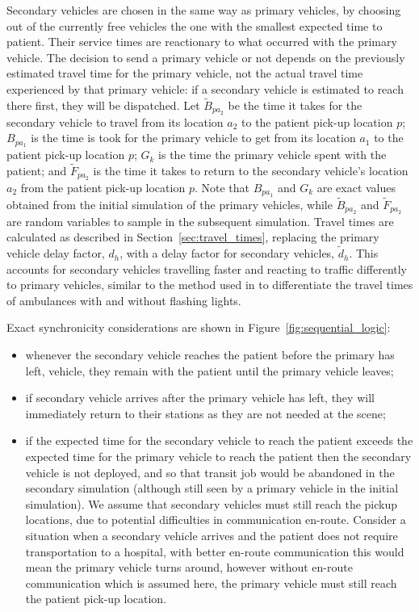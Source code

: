 \documentclass[numbers,webpdf,imaman]{ima-authoring-template}%
\begin{document}
Secondary vehicles are chosen in the same way as primary vehicles, by choosing
out of the currently free vehicles the one with the smallest expected time to
patient. Their service times are reactionary to what occurred with the primary
vehicle. The decision to send a primary vehicle or not depends on the previously
estimated travel time for the primary vehicle, not the actual travel time
experienced by that primary vehicle: if a secondary vehicle is estimated to
reach there first, they will be dispatched.
Let $\tilde{B}_{pa_2}$ be the time it takes for the secondary vehicle to travel
from its location $a_2$ to the patient pick-up location $p$; $B_{pa_1}$ is the
time is took for the primary vehicle to get from its location $a_1$ to the
patient pick-up location $p$; $G_k$ is the time the primary vehicle spent
with the patient; and $\tilde{F}_{pa_2}$ is the time it takes to return to the
secondary vehicle's location $a_2$ from the patient pick-up location $p$.
Note that $B_{pa_1}$ and $G_k$ are exact values obtained from the
initial simulation of the primary vehicles, while $\tilde{B}_{pa_2}$ and
$\tilde{F}_{pa_2}$ are random variables to sample in the subsequent simulation.
Travel times are calculated as described in Section~\ref{sec:travel_times},
replacing the primary vehicle delay factor, $d_h$, with a delay factor for
secondary vehicles, $\tilde{d}_h$. This accounts for secondary vehicles
travelling faster and reacting to traffic differently to primary vehicles,
similar to the method used in \citet{hendersonmason04} to differentiate the
travel times of ambulances with and without flashing lights.

Exact synchronicity considerations are shown in Figure~\ref{fig:sequential_logic}:
\begin{itemize}
  \item whenever the secondary vehicle reaches the patient before the primary
  has left, vehicle, they remain with the patient until the primary vehicle
  leaves;
  \item if secondary vehicle arrives after the primary vehicle has left, they
  will immediately return to their stations as they are not needed at the scene;
  \item if the expected time for the secondary vehicle to reach the patient
  exceeds the expected time for the primary vehicle to reach the patient then
  the secondary vehicle is not deployed, and so that transit job would be
  abandoned in the secondary simulation (although still seen by a primary
  vehicle in the initial simulation). We assume that secondary vehicles must
  still reach the pickup locations, due to potential difficulties in
  communication en-route. Consider a situation when a
  secondary vehicle arrives and the patient does not require transportation to
  a hospital, with better en-route communication this would mean the primary
  vehicle turns around, however without en-route communication which is
  assumed here, the primary vehicle must still reach the patient pick-up
  location.
\end{itemize}
\end{document}
